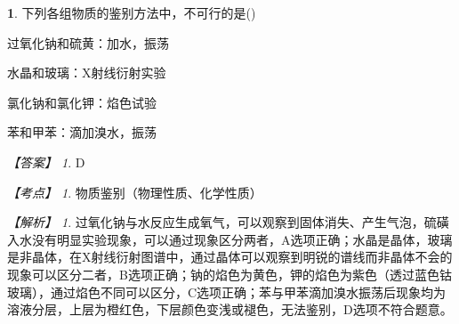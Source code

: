 \documentclass[UTF8, 10pt, a4paper, oneside]{ctexart}
\newcommand{\fs}[1]{{\fangsong #1}}%
\theoremstyle{definition}
\newtheorem{subexercise}{}[exercise]%
\theoremstyle{remark}
\newtheorem*{answer}{【答案】}
\newtheorem*{point}{【考点】}      %
\newtheorem*{explanation}{【解析】}     %
\theoremstyle{plain}
\begin{document}
\begin{subexercise}
    \fs{[2024·安徽卷]}下列各组物质的鉴别方法中，不可行的是\quad (\quad)
    \begin{adjustwidth}{4em}{}
        \begin{asparaenum}[A. ]
            \item 过氧化钠和硫黄：加水，振荡
            \item 水晶和玻璃：X射线衍射实验
            \item 氯化钠和氯化钾：焰色试验
            \item 苯和甲苯：滴加溴水，振荡
        \end{asparaenum}
    \end{adjustwidth}
    \begin{answer}
        D
    \end{answer}
    \begin{point}
        物质鉴别（物理性质、化学性质）
    \end{point}
    \begin{explanation}
        过氧化钠与水反应生成氧气，可以观察到固体消失、产生气泡，硫磺入水没有明显实验现象，可以通过现象区分两者，A选项正确；水晶是晶体，玻璃是非晶体，在X射线衍射图谱中，通过晶体可以观察到明锐的谱线而非晶体不会的现象可以区分二者，B选项正确；钠的焰色为黄色，钾的焰色为紫色（透过蓝色钴玻璃），通过焰色不同可以区分，C选项正确；苯与甲苯滴加溴水振荡后现象均为溶液分层，上层为橙红色，下层颜色变浅或褪色，无法鉴别，D选项不符合题意。
    \end{explanation}
\end{subexercise}
\end{document}
